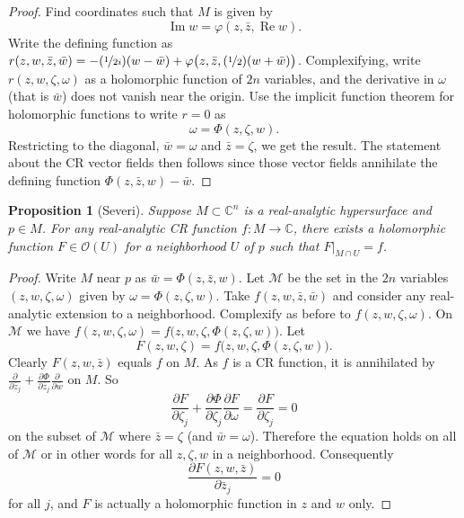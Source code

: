 \documentclass[12pt,openany]{book}
\renewcommand{\Re}{\operatorname{Re}}
\renewcommand{\Im}{\operatorname{Im}}
\newcommand{\C}{{\mathbb{C}}}
\newcommand{\sM}{{\mathscr{M}}}
\newcommand{\sO}{{\mathscr{O}}}
\theoremstyle{plain}
\newtheorem{prop}[thm]{Proposition}
\theoremstyle{remark}
\theoremstyle{definition}
\theoremstyle{exercise}
\theoremstyle{example}
\begin{document}
\begin{proof}
Find coordinates such that $M$ is given by
\begin{equation*}
\Im w = \varphi(z,\bar{z},\Re w) .
\end{equation*}
Write the defining function
as $r(z,w,\bar{z},\bar{w}) = -(\nicefrac{1}{2i})(w-\bar{w})
+\varphi\bigl(z,\bar{z},(\nicefrac{1}{2})(w+\bar{w})\bigr)$.
Complexifying, write
$r(z,w,\zeta,\omega)$ as
a holomorphic function of $2n$ variables, and the derivative in
$\omega$ (that is $\bar{w}$) does not vanish near the origin.
Use the implicit function theorem for holomorphic functions to write 
$r = 0$ as
\begin{equation*}
\omega = \Phi(z,\zeta,w) .
\end{equation*}
Restricting to the diagonal, $\bar{w} = \omega$ and $\bar{z}=\zeta$,
we get the result.
The statement about the CR vector fields then follows since those vector
fields annihilate the defining function $\Phi(z,\bar{z},w)-\bar{w}$.
\end{proof}

\begin{prop}[Severi] \label{prop:severi}
Suppose $M \subset \C^n$ is a real-analytic hypersurface and $p \in M$.
For any real-analytic CR function $f \colon M \to \C$, there exists
a holomorphic function $F \in \sO(U)$ for a neighborhood $U$ of $p$
such that $F|_{M \cap U} = f$.
\end{prop}

\begin{proof}
Write $M$ near $p$ as $\bar{w} = \Phi(z,\bar{z},w)$.
Let $\sM$ be the set in the $2n$ variables $(z,w,\zeta,\omega)$ given by
$\omega = \Phi(z,\zeta,w)$.
Take $f(z,w,\bar{z},\bar{w})$ and consider any real-analytic extension
to a neighborhood.  Complexify as before to
$f(z,w,\zeta,\omega)$.  On $\sM$ we have
$f(z,w,\zeta,\omega) = f\bigl(z,w,\zeta,\Phi(z,\zeta,w)\bigr)$.  Let
\begin{equation*}
F(z,w,\zeta) = f\bigl(z,w,\zeta,\Phi(z,\zeta,w)\bigr).
\end{equation*}
Clearly $F(z,w,\bar{z})$ equals $f$ on $M$.  
As $f$ is a CR function, it is annihilated by
$\frac{\partial}{\partial \bar{z}_j}
+\frac{\partial \Phi}{\partial \bar{z}_j} \frac{\partial}{\partial
\bar{w}}$ on $M$.  So
\begin{equation*}
\frac{\partial F}{\partial \zeta_j}
+\frac{\partial \Phi}{\partial \zeta_j} \frac{\partial F}{\partial
\omega}
=
\frac{\partial F}{\partial \zeta_j} = 0
\end{equation*}
on the subset of $\sM$ where $\bar{z} = \zeta$ (and $\bar{w}=\omega$).
Therefore the equation holds on all of $\sM$ or in other words for
all $z,\zeta,w$ in a neighborhood.  Consequently
\begin{equation*}
\frac{\partial F(z,w,\bar{z})}{\partial \bar{z}_j} = 0
\end{equation*}
for all $j$,
and $F$ is actually a holomorphic function in $z$ and $w$ only.
\end{proof}
\end{document}

